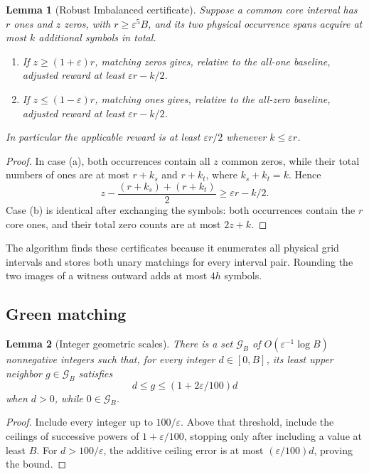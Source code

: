 \documentclass[11pt]{article}
\newtheorem{lemma}[lemma]{Lemma}
\theoremstyle{remark}
\newcommand{\eps}{\varepsilon}
\begin{document}
\begin{lemma}[Robust Imbalanced certificate]\label{lem:imbalanced}
Suppose a common core interval has $r$ ones and $z$ zeros, with
$r\ge\eps^5B$, and its two physical occurrence spans acquire at most $k$
additional symbols in total.
\begin{enumerate}[label=(\alph*)]
\item If $z\ge(1+\eps)r$, matching zeros gives, relative to the all-one
      baseline, adjusted reward at least $\eps r-k/2$.
\item If $z\le(1-\eps)r$, matching ones gives, relative to the all-zero
      baseline, adjusted reward at least $\eps r-k/2$.
\end{enumerate}
In particular the applicable reward is at least $\eps r/2$ whenever
$k\le\eps r$.
\end{lemma}

\begin{proof}
In case (a), both occurrences contain all $z$ common zeros, while their total
numbers of ones are at most $r+k_s$ and $r+k_t$, where $k_s+k_t=k$.  Hence
\[
 z-\frac{(r+k_s)+(r+k_t)}2\ge\eps r-k/2.
\]
Case (b) is identical after exchanging the symbols: both occurrences contain
the $r$ core ones, and their total zero counts are at most
$2z+k$.
\end{proof}

The algorithm finds these certificates because it enumerates all physical
grid intervals and stores both unary matchings for every interval pair.
Rounding the two images of a witness outward adds at most $4h$ symbols.

\subsection{Green matching}

\begin{lemma}[Integer geometric scales]\label{lem:geometric-green}
There is a set $\mathcal G_B$ of
$O(\eps^{-1}\log B)$ nonnegative integers such that, for every integer
$d\in[0,B]$, its least upper neighbor $g\in\mathcal G_B$ satisfies
\[
 d\le g\le(1+2\eps/100)d
\]
when $d>0$, while $0\in\mathcal G_B$.
\end{lemma}

\begin{proof}
Include every integer up to $100/\eps$.  Above that threshold, include the
ceilings of successive powers of $1+\eps/100$, stopping only after including
a value at least $B$.  For $d>100/\eps$, the
additive ceiling error is at most $(\eps/100)d$, proving the bound.
\end{proof}
\end{document}
